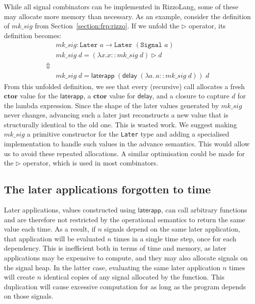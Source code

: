 While all signal combinators can be implemented in RizzoLang, some of these may allocate more memory than necessary.
As an example, consider the definition of $mk\_sig$ from Section~\ref{section:frp:rizzo}. 
If we unfold the $\triangleright$ operator, its definition becomes:
\[
\begin{aligned}
    &mk\_sig : \texttt{Later }a \rightarrow \texttt{Later }(\texttt{Signal }a) \\
    &mk\_sig \; d = (\lambda x. x :: mk\_sig \; d) \triangleright d \\
    \Updownarrow \\
    &mk\_sig \; d = \mathsf{laterapp} \; (\mathsf{delay} \; (\lambda a. \, a :: mk\_sig \; d)) \; d
\end{aligned}
\]
From this unfolded definition, we see that every (recursive) call allocates a fresh $\mathbf{ctor}$ value for the $\mathsf{laterapp}$, a $\mathbf{ctor}$ value for $\mathsf{delay}$, and a closure to capture $d$ for the lambda expression.
Since the shape of the later values generated by $mk\_sig$ never changes, advancing such a later just reconstructs a new value that is structurally identical to the old one. This is wasted work.
We suggest making $mk\_sig$ a primitive constructor for the \texttt{Later} type and adding a specialised implementation to handle such values in the advance semantics. This would allow us to avoid these repeated allocations. 
A similar optimisation could be made for the $\triangleright$ operator, which is used in most combinators.

\subsection{The later applications forgotten to time}\label{sec:later_applications_forget}

Later applications, values constructed using $\mathsf{laterapp}$, can call arbitrary functions and are therefore not restricted by the operational semantics to return the same value each time. As a result, if $n$ signals depend on the same later application, that application will be evaluated $n$ times in a single time step, once for each dependency. This is inefficient both in terms of time and memory, as later applications may be expensive to compute, and they may also allocate signals on the signal heap. In the latter case, evaluating the same later application $n$ times will create $n$ identical copies of any signal allocated by the function. This duplication will cause excessive computation for as long as the program depends on those signals.

